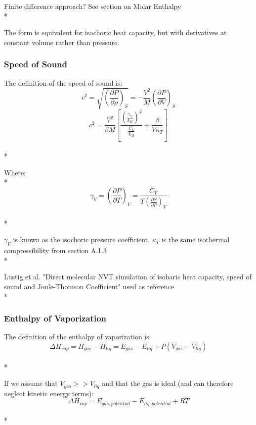 \documentclass[a4paper,12pt]{article}
\begin{document}
\noindent Finite difference approach? See section on Molar Enthalpy\\*

\noindent The form is equivalent for isochoric heat capacity, but with derivatives at constant volume rather than pressure.

\subsubsection{Speed of Sound}
\noindent The definition of the speed of sound is:
\begin{equation}c^2 = \sqrt{\left(\frac{\partial P}{\partial \rho}\right)_{S}} = -\frac{V^2}{M}\left(\frac{\partial P}{\partial V}\right)_{S}\end{equation}
\begin{equation}c^2 = \frac{V^2}{\beta M}\left[\frac{\left(\frac{\gamma_V}{k_B}\right)^2}{\frac{C_V}{k_B}} + \frac{\beta}{V \kappa_T}\right]\end{equation}\\*

\noindent Where:\\*
\begin{equation}\gamma_V = \left(\frac{\partial P}{\partial T}\right)_{V} = \frac{C_V}{T \left(\frac{\partial S}{\partial P}\right)_{V}}\end{equation}\\*

\noindent $\gamma_V$ is known as the isochoric pressure coefficient. $\kappa_T$ is the same isothermal compressibility from section A.1.3\\*

\noindent Lustig et al. "Direct molecular NVT simulation of isobaric heat capacity, speed of sound and Joule-Thomson Coefficient" used as reference\\*


\subsubsection{Enthalpy of Vaporization}
\noindent The definition of the enthalpy of vaporization is:
\begin{equation}\Delta H_{vap} = H_{gas} - H_{liq} = E_{gas} - E_{liq} + P(V_{gas} - V_{liq})\end{equation}\\*

\noindent If we assume that $V_{gas} >> V_{liq}$ and that the gas is ideal (and can therefore neglect kinetic energy terms):
\begin{equation}\Delta H_{vap} = E_{gas, potential} - E_{liq, potential} + R T\end{equation}\\*
\end{document}
